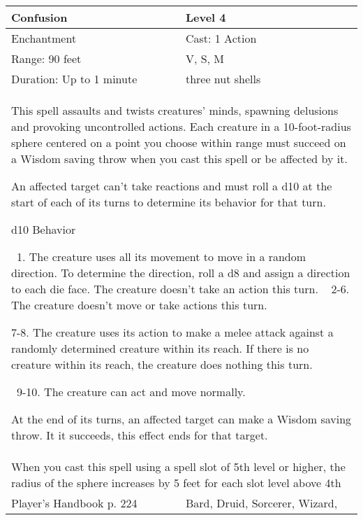 \documentclass[11pt]{report}
\begin{document}
\begin{table}[H]
	\begin{tabular}{||p{6cm}|p{6cm}||}
		\hline\hline
		\bf{Confusion} & Level 4\\ \hline
		Enchantment & Cast: 1 Action\\ \hline
		Range: 90 feet & V, S, M \\ \hline
		Duration: Up to 1 minute & three nut shells\\ \hline
		\multicolumn{2}{||p{12cm}||}{This spell assaults and twists creatures’ minds, spawning delusions and provoking uncontrolled actions. Each creature in a 10-foot-radius sphere centered on a point you choose within range must succeed on a Wisdom saving throw when you cast this spell or be affected by it. 

An affected target can’t take reactions and must roll a d10 at the start of each of its turns to determine its behavior for that turn. 

d10   Behavior 

 1. The creature uses all its movement to move in a random direction. To determine the direction, roll a d8 and assign a direction to each die face. The creature doesn’t take an action this turn. 
 
2-6. The creature doesn’t move or take actions this turn. 

7-8. The creature uses its action to make a melee attack against a randomly determined creature within its reach. If there is no creature within its reach, the creature does nothing this turn. 

 9-10. The creature can act and move normally. 

At the end of its turns, an affected target can make a Wisdom saving throw. It it succeeds, this effect ends for that target.}\\ \hline
		\multicolumn{2}{||p{12cm}||}{When you cast this spell using a spell slot of 5th level or higher, the radius of the sphere increases by 5 feet for each slot level above 4th}\\ \hline
Player's Handbook p. 224 & Bard, Druid, Sorcerer, Wizard, \\ \hline\hline
	\end{tabular}
\end{table}
\end{document}
